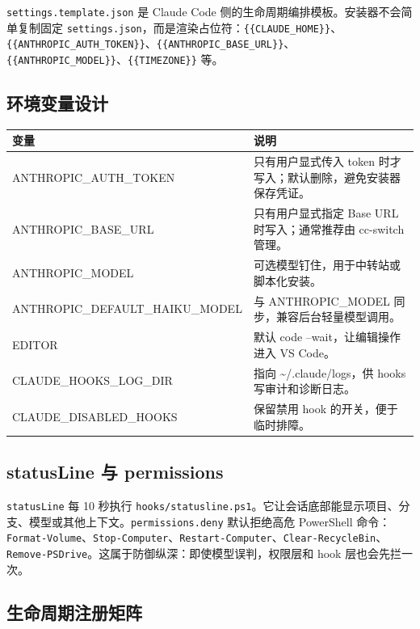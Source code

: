 \documentclass[11pt,a4paper]{ctexbook}
\begin{document}
\texttt{settings.template.json} 是 Claude Code 侧的生命周期编排模板。安装器不会简单复制固定 \texttt{settings.json}，而是渲染占位符：\texttt{\{\{CLAUDE\_HOME\}\}}、\texttt{\{\{ANTHROPIC\_AUTH\_TOKEN\}\}}、\texttt{\{\{ANTHROPIC\_BASE\_URL\}\}}、\texttt{\{\{ANTHROPIC\_MODEL\}\}}、\texttt{\{\{TIMEZONE\}\}} 等。

\subsection{环境变量设计}

\begin{longtable}{p{}p{}}
\toprule
变量 & 说明 \\
\midrule
ANTHROPIC\_AUTH\_TOKEN & 只有用户显式传入 token 时才写入；默认删除，避免安装器保存凭证。 \\
ANTHROPIC\_BASE\_URL & 只有用户显式指定 Base URL 时写入；通常推荐由 cc-switch 管理。 \\
ANTHROPIC\_MODEL & 可选模型钉住，用于中转站或脚本化安装。 \\
ANTHROPIC\_DEFAULT\_HAIKU\_MODEL & 与 ANTHROPIC\_MODEL 同步，兼容后台轻量模型调用。 \\
EDITOR & 默认 code --wait，让编辑操作进入 VS Code。 \\
CLAUDE\_HOOKS\_LOG\_DIR & 指向 \textasciitilde{}/.claude/logs，供 hooks 写审计和诊断日志。 \\
CLAUDE\_DISABLED\_HOOKS & 保留禁用 hook 的开关，便于临时排障。 \\
\bottomrule
\end{longtable}

\subsection{statusLine 与 permissions}

\texttt{statusLine} 每 10 秒执行 \texttt{hooks/statusline.ps1}。它让会话底部能显示项目、分支、模型或其他上下文。\texttt{permissions.deny} 默认拒绝高危 PowerShell 命令：\texttt{Format-Volume}、\texttt{Stop-Computer}、\texttt{Restart-Computer}、\texttt{Clear-RecycleBin}、\texttt{Remove-PSDrive}。这属于防御纵深：即使模型误判，权限层和 hook 层也会先拦一次。

\subsection{生命周期注册矩阵}
\end{document}

